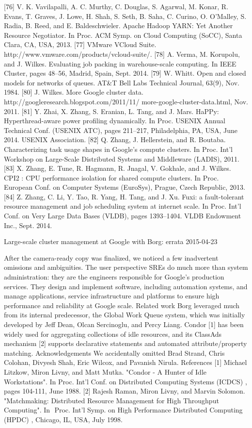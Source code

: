 [76] V. K. Vavilapalli, A. C. Murthy, C. Douglas, S. Agarwal,
M. Konar, R. Evans, T. Graves, J. Lowe, H. Shah, S. Seth,
B. Saha, C. Curino, O. O’Malley, S. Radia, B. Reed, and
E. Baldeschwieler. Apache Hadoop YARN: Yet Another
Resource Negotiator. In Proc. ACM Symp. on Cloud
Computing (SoCC), Santa Clara, CA, USA, 2013.
[77] VMware VCloud Suite.
http://www.vmware.com/products/vcloud-suite/.
[78] A. Verma, M. Korupolu, and J. Wilkes. Evaluating job
packing in warehouse-scale computing. In IEEE Cluster,
pages 48–56, Madrid, Spain, Sept. 2014.
[79] W. Whitt. Open and closed models for networks of queues.
AT&T Bell Labs Technical Journal, 63(9), Nov. 1984.
[80] J. Wilkes. More Google cluster data.
http://googleresearch.blogspot.com/2011/11/
more-google-cluster-data.html, Nov. 2011.
[81] Y. Zhai, X. Zhang, S. Eranian, L. Tang, and J. Mars. HaPPy:
Hyperthread-aware power profiling dynamically. In Proc.
USENIX Annual Technical Conf. (USENIX ATC), pages
211–217, Philadelphia, PA, USA, June 2014. USENIX
Association.
[82] Q. Zhang, J. Hellerstein, and R. Boutaba. Characterizing task
usage shapes in Google’s compute clusters. In Proc. Int’l
Workshop on Large-Scale Distributed Systems and
Middleware (LADIS), 2011.
[83] X. Zhang, E. Tune, R. Hagmann, R. Jnagal, V. Gokhale, and
J. Wilkes. CPI2 : CPU performance isolation for shared
compute clusters. In Proc. European Conf. on Computer
Systems (EuroSys), Prague, Czech Republic, 2013.
[84] Z. Zhang, C. Li, Y. Tao, R. Yang, H. Tang, and J. Xu. Fuxi: a
fault-tolerant resource management and job scheduling
system at internet scale. In Proc. Int’l Conf. on Very Large
Data Bases (VLDB), pages 1393–1404. VLDB Endowment
Inc., Sept. 2014.


Large-scale cluster management at Google with Borg: errata
2015-04-23

After the camera-ready copy was finalized, we noticed a few inadvertent omissions and
ambiguities.
The user perspective
SREs do much more than system administration: they are the engineers responsible for Google’s
production services. They design and implement software, including automation systems, and
manage applications, service infrastructure and platforms to ensure high performance and
reliability at Google scale.
Related work
Borg leveraged much from its internal predecessor, the Global Work Queue system, which was
initially developed by Jeff Dean, Olcan Sercinoglu, and Percy Liang.
Condor [1] has been widely used for aggregating collections of idle resources, and its ClassAds
mechanism [2] supports declarative statements and automated attribute/property matching.
Acknowledgements
We accidentally omitted Brad Strand, Chris Colohan, Divyesh Shah, Eric Wilcox, and Pavanish
Nirula.
References
[1] Michael Litzkow, Miron Livny, and Matt Mutka. "Condor - A Hunter of Idle Workstations". In
Proc. Int'l Conf. on Distributed Computing Systems (ICDCS)​
, pages 104-111, June 1988.
[2] Rajesh Raman, Miron Livny, and Marvin Solomon. "Matchmaking: Distributed Resource
Management for High Throughput Computing". In ​
Proc. Int'l Symp. on High Performance
Distributed Computing (HPDC)​
, Chicago, IL, USA, July 1998.


